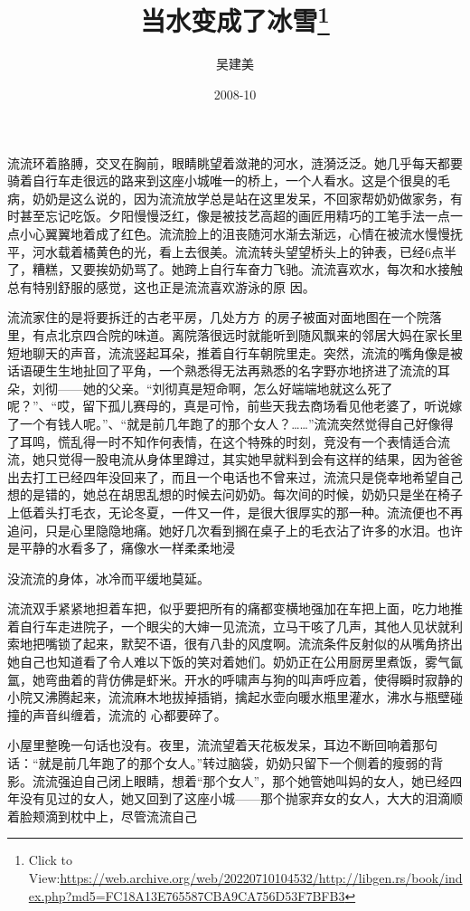 \documentclass{article}
\title{当水变成了冰雪\footnote{Click to View:\url{https://web.archive.org/web/20220710104532/http://libgen.rs/book/index.php?md5=FC18A13E765587CBA9CA756D53F7BFB3}}}
\author{吴建美}
\date{2008-10}
\begin{document}

\maketitle


\Large

流流环着胳膊，交叉在胸前，眼睛眺望着潋滟的河水，涟漪泛泛。她几乎每天都要骑着自行车走很远的路来到这座小城唯一的桥上，一个人看水。这是个很臭的毛病，奶奶是这么说的，因为流流放学总是站在这里发呆，不回家帮奶奶做家务，有时甚至忘记吃饭。夕阳慢慢泛红，像是被技艺高超的画匠用精巧的工笔手法一点一点小心翼翼地着成了红色。流流脸上的沮丧随河水渐去渐远，心情在被流水慢慢抚平，河水载着橘黄色的光，看上去很美。流流转头望望桥头上的钟表，已经6点半了，糟糕，又要挨奶奶骂了。她跨上自行车奋力飞驰。流流喜欢水，每次和水接触总有特别舒服的感觉，这也正是流流喜欢游泳的原
因。 

流流家住的是将要拆迁的古老平房，几处方方
\newpage
的房子被面对面地图在一个院落里，有点北京四合院的味道。离院落很远时就能听到随风飘来的邻居大妈在家长里短地聊天的声音，流流竖起耳朵，推着自行车朝院里走。突然，流流的嘴角像是被话语硬生生地扯回了平角，一个熟悉得无法再熟悉的名字野亦地挤进了流流的耳朵，刘彻——她的父亲。“刘彻真是短命啊，怎么好端端地就这么死了呢？”、“哎，留下孤儿赛母的，真是可怜，前些天我去商场看见他老婆了，听说嫁了一个有钱人呢。”、“就是前几年跑了的那个女人？……”流流突然觉得自己好像得了耳鸣，慌乱得一时不知作何表情，在这个特殊的时刻，竞没有一个表情适合流流，她只觉得一股电流从身体里蹲过，其实她早就料到会有这样的结果，因为爸爸出去打工已经四年没回来了，而且一个电话也不曾来过，流流只是侥幸地希望自己想的是错的，她总在胡思乱想的时候去问奶奶。每次间的时候，奶奶只是坐在椅子上低着头打毛衣，无论冬夏，一件又一件，是很大很厚实的那一种。流流便也不再追问，只是心里隐隐地痛。她好几次看到搁在桌子上的毛衣沾了许多的水泪。也许是平静的水看多了，痛像水一样柔柔地浸

\newpage
没流流的身体，冰冷而平缓地莫延。 

流流双手紧紧地担着车把，似乎要把所有的痛都变横地强加在车把上面，吃力地推着自行车走进院子，一个眼尖的大婶一见流流，立马干咳了几声，其他人见状就利索地把嘴锁了起来，默契不语，很有八卦的风度啊。流流条件反射似的从嘴角挤出她自己也知道看了令人难以下饭的笑对着她们。奶奶正在公用厨房里煮饭，雾气氤氲，她弯曲着的背仿佛是虾米。开水的呼啸声与狗的叫声呼应着，使得瞬时寂静的小院又沸腾起来，流流麻木地拔掉插销，擒起水壶向暖水瓶里灌水，沸水与瓶壁碰撞的声音纠缠着，流流的
心都要碎了。 

小屋里整晚一句话也没有。夜里，流流望着天花板发呆，耳边不断回响着那句话：“就是前几年跑了的那个女人。”转过脑袋，奶奶只留下一个侧着的瘦弱的背影。流流强迫自己闭上眼睛，想着“那个女人”，那个她管她叫妈的女人，她已经四年没有见过的女人，她又回到了这座小城——那个抛家弃女的女人，大大的泪滴顺着脸颊滴到枕中上，尽管流流自己
\end{document}
